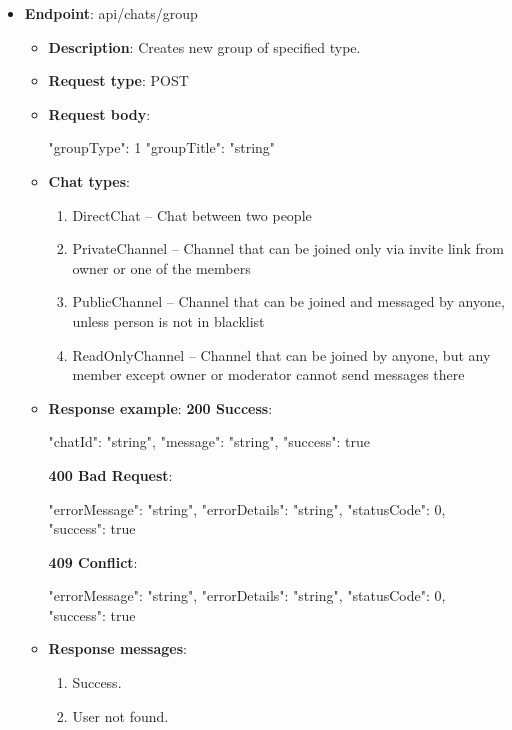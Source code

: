 \begin{itemize}
    \item \textbf{Endpoint}: api/chats/group
    \begin{itemize}
        \item \textbf{Description}: Creates new group of specified type.
        \item \textbf{Request type}: POST
        \item \textbf{Request body}:
        \begin{spverbatim}
        {
            "groupType": 1
            "groupTitle": "string"
        }
        \end{spverbatim}
        \item \textbf{Chat types}:
        \begin{enumerate}
            \item DirectChat -- Chat between two people
            \item PrivateChannel -- Channel that can be joined only via invite link from owner or one of the members
            \item PublicChannel -- Channel that can be joined and messaged by anyone, unless person is not in blacklist
            \item ReadOnlyChannel -- Channel that can be joined by anyone, but any member except owner or moderator cannot send messages there
        \end{enumerate}
        \item \textbf{Response example}:
        \textbf{200 Success}:
        \begin{spverbatim}
        {
            "chatId": "string",
            "message": "string",
            "success": true
        }
        \end{spverbatim}
        \textbf{400 Bad Request}:
        \begin{spverbatim}
        {
            "errorMessage": "string",
            "errorDetails": "string",
            "statusCode": 0,
            "success": true
        }
        \end{spverbatim}
        \textbf{409 Conflict}:
        \begin{spverbatim}
        {
            "errorMessage": "string",
            "errorDetails": "string",
            "statusCode": 0,
            "success": true
        }
        \end{spverbatim}
        \item \textbf{Response messages}:
        \begin{enumerate}
            \item Success.
            \item User not found.
        \end{enumerate}
    \end{itemize}


\end{itemize}
